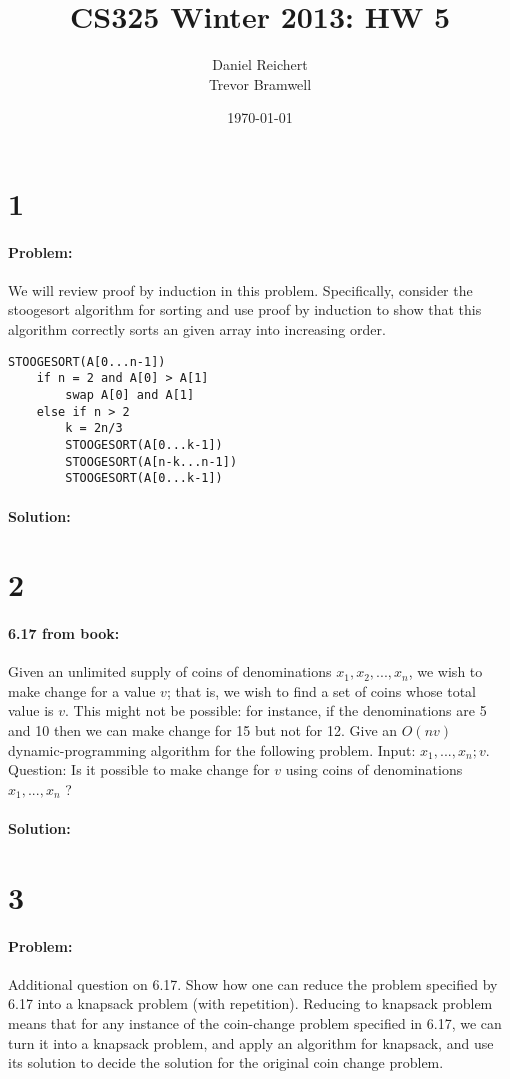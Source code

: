 \documentclass[12pt]{article}
\title{CS325 Winter 2013: HW 5}
\author{
    Daniel Reichert \\
    Trevor Bramwell \\
}
\date{\today}
\newcommand{\BigO}[1]{\ensuremath{O(#1)}}
\begin{document}
\maketitle
\section*{1}
\paragraph{Problem:}
We will review proof by induction in this problem. Specifically, consider the
stoogesort algorithm for sorting and use proof by induction to show that this
algorithm correctly sorts an given array into increasing order.
\begin{lstlisting}[mathescape]
STOOGESORT(A[0...n-1])
    if n = 2 and A[0] > A[1]
        swap A[0] and A[1]
    else if n > 2
        k = 2n/3
        STOOGESORT(A[0...k-1])
        STOOGESORT(A[n-k...n-1])
        STOOGESORT(A[0...k-1])
\end{lstlisting}
\paragraph{Solution:}

\section*{2}
\paragraph{6.17 from book:}
Given an unlimited supply of coins of denominations $x_1 , x_2 , . . . , x_n$,
we wish to make change for a value $v$; that is, we wish to find a set of coins
whose total value is $v$. This might not be possible: for instance, if the
denominations are 5 and 10 then we can make change for 15 but not for 12.
Give an $\BigO{nv}$ dynamic-programming algorithm for the following problem.
Input: $x_1 , . . . , x_n ; v$.
Question: Is it possible to make change for $v$ using coins of denominations $x_1 , . . . , x_n$ ?
\paragraph{Solution:}


\section*{3}
\paragraph{Problem:}
Additional question on 6.17. Show how one can reduce the problem specified by
6.17 into a knapsack problem (with repetition). Reducing to knapsack problem
means that for any instance of the coin-change problem specified in 6.17, we
can turn it into a knapsack problem, and apply an algorithm for knapsack, and
use its solution to decide the solution for the original coin change problem.
\end{document}
